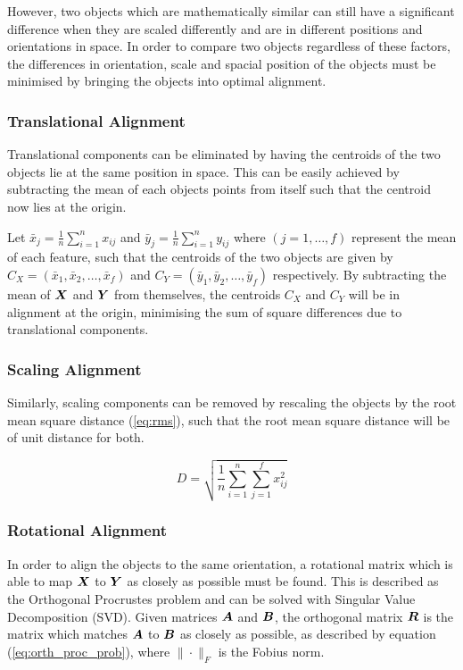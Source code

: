 However, two objects which are mathematically similar can still have a significant difference when they are scaled differently and are in different positions and orientations in space.
In order to compare two objects regardless of these factors, the differences in orientation, scale and spacial position of the objects must be minimised by bringing the objects into optimal alignment.

\subsubsection{Translational Alignment} \label{sec:trans_align}
Translational components can be eliminated by having the centroids of the two objects lie at the same position in space.
This can be easily achieved by subtracting the mean of each objects points from itself such that the centroid now lies at the origin.

Let $\bar{x}_j = \frac{1}{n} \sum_{i=1}^{n} x_{ij}$ and $\bar{y}_j = \frac{1}{n} \sum_{i=1}^{n} y_{ij}$ where $(j = 1, \dots, f)$ represent the mean of each feature, such that the centroids of the two objects are given by $C_X = (\bar{x}_1, \bar{x}_2, \dots, \bar{x}_f)$ and $C_Y = (\bar{y}_1, \bar{y}_2, \dots, \bar{y}_f)$ respectively.
By subtracting the mean of ${\boldsymbol{{X}}}$ and ${\boldsymbol{{Y}}}$ from themselves, the centroids $C_X$ and $C_Y$ will be in alignment at the origin, minimising the sum of square differences due to translational components.

\subsubsection{Scaling Alignment} \label{sec:scale_align}
Similarly, scaling components can be removed by rescaling the objects by the root mean square distance (\ref{eq:rms}), such that the root mean square distance will be of unit distance for both.

\begin{equation}
    \label{eq:rms}
    D = \sqrt{\frac{1}{n} \sum_{i=1}^{n} \sum_{j=1}^{f} x_{ij}^2}
\end{equation}

\subsubsection{Rotational Alignment} \label{sec:rot_align}
In order to align the objects to the same orientation, a rotational matrix which is able to map ${\boldsymbol{{X}}}$ to ${\boldsymbol{{Y}}}$ as closely as possible must be found.
This is described as the Orthogonal Procrustes problem and can be solved with Singular Value Decomposition (SVD).
Given matrices ${\boldsymbol{{A}}}$ and ${\boldsymbol{{B}}}$, the orthogonal matrix ${\boldsymbol{{R}}}$ is the matrix which matches ${\boldsymbol{{A}}}$ to ${\boldsymbol{{B}}}$ as closely as possible, as described by equation (\ref{eq:orth_proc_prob}), where $\| \cdot \|_F$ is the Fobius norm.

